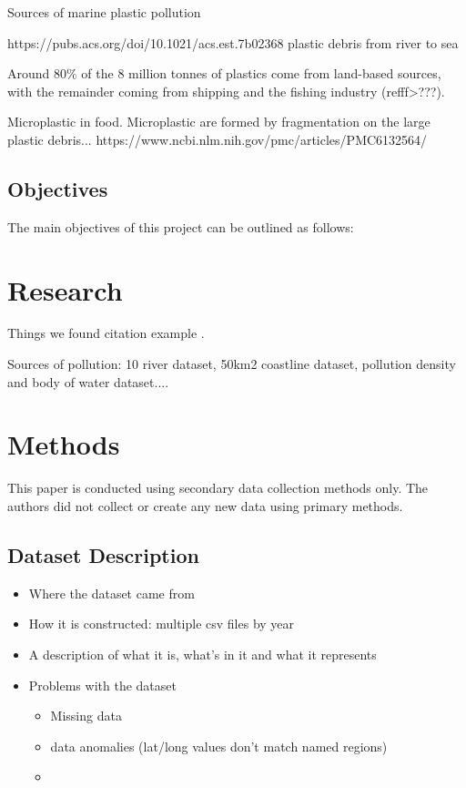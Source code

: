 \documentclass[10pt]{article}\usepackage[]{graphicx}\usepackage[]{color}
\begin{document}
Sources of marine plastic pollution

https://pubs.acs.org/doi/10.1021/acs.est.7b02368 plastic debris from river to sea

Around 80\% of the 8 million tonnes of plastics come from land-based sources, with the remainder coming from shipping and the fishing industry (refff>???). 

Microplastic in food. Microplastic are formed by fragmentation on the large plastic debris...
https://www.ncbi.nlm.nih.gov/pmc/articles/PMC6132564/



\subsection{Objectives }\label{obj}

The main objectives of this project can be outlined as follows: 




\section{Research}\label{research}

Things we found
citation example \cite{8489087}.

Sources of pollution: 10 river dataset, 50km2 coastline dataset, pollution density and body of water dataset....


\section {Methods}\label{methods}

This paper is conducted using secondary data collection methods only. The authors did not collect or create any new data using primary methods.


\subsection{Dataset Description}\label{dataset}

\begin{itemize}
\item Where the dataset came from
\item How it is constructed: multiple csv files by year
\item A description of what it is, what's in it and what it represents
\item Problems with the dataset
  \begin{itemize}
  \item Missing data
  \item data anomalies (lat/long values don't match named regions)
  \item 
  \end{itemize}
\end{itemize}
\end{document}
